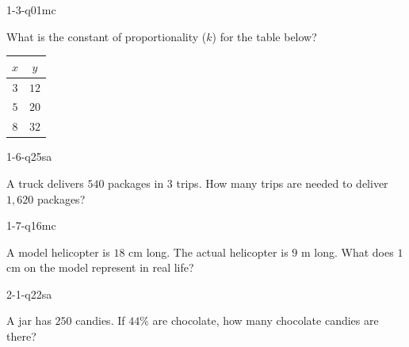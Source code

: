 
\begin{practiceQuestion}{1-3-q01}{mc}
\begin{questionText}
What is the constant of proportionality ($k$) for the table below?

\begin{center}
\begin{tabular}{|c|c|}
\hline $x$ & $y$ \\ \hline $3$ & $12$ \\ $5$ & $20$ \\ $8$ & $32$ \\ \hline
\end{tabular}
\end{center}
\end{questionText}
\end{practiceQuestion}

\begin{practiceQuestion}{1-6-q25}{sa}
\begin{questionText}
A truck delivers $540$ packages in $3$ trips. How many trips are needed to deliver $1{,}620$ packages?
\end{questionText}
\end{practiceQuestion}

\begin{practiceQuestion}{1-7-q16}{mc}
\begin{questionText}
A model helicopter is $18$ cm long. The actual helicopter is $9$ m long. What does $1$ cm on the model represent in real life?
\end{questionText}
\end{practiceQuestion}

\begin{practiceQuestion}{2-1-q22}{sa}
\begin{questionText}
A jar has $250$ candies. If $44\%$ are chocolate, how many chocolate candies are there?
\end{questionText}
\end{practiceQuestion}

